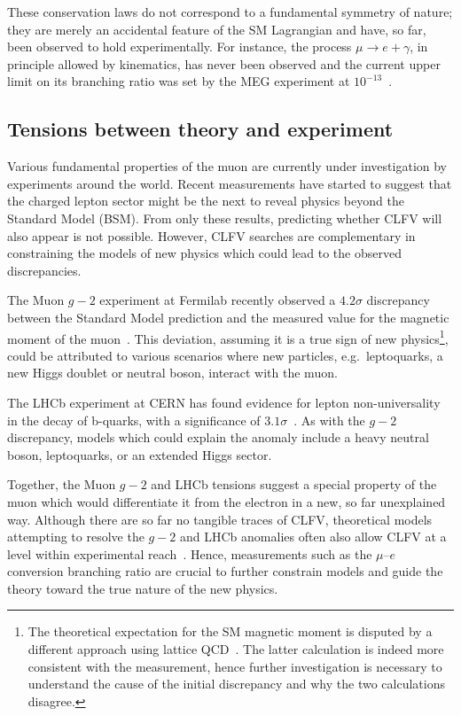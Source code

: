 These conservation laws do not correspond to a fundamental symmetry of nature;
they are merely an accidental feature of the SM Lagrangian and have, so far,
been observed to hold experimentally. 
For instance, the process ${\mu \rightarrow e + \gamma}$, in principle allowed
by kinematics, has never been observed and the current upper limit on its
branching ratio was set by the MEG experiment at
$10^{-13}$~\cite{mori2016final}. 



\subsection{Tensions between theory and experiment}
Various fundamental properties of the muon are currently under investigation by
experiments around the world. Recent measurements have started to suggest that
the charged lepton sector might be the next to reveal physics beyond the
Standard Model (BSM). From only these results, predicting whether CLFV will also
appear is not possible. However, CLFV searches are complementary in constraining
the models of new physics which could lead to the observed discrepancies.

The Muon $g-2$ experiment at Fermilab recently observed a $4.2\sigma$
discrepancy between the Standard Model prediction and the measured value for the
magnetic moment of the muon~\cite{PhysRevLett.126.141801}. This deviation,
assuming it is a true sign of new physics\footnote{
    The theoretical expectation for the SM magnetic moment is disputed by a
    different approach using lattice QCD~\cite{Borsanyi2021}. The latter calculation
    is indeed more consistent with the measurement, hence further investigation is
    necessary to understand the cause of the initial discrepancy and why the two
    calculations disagree.
}, could be attributed to various scenarios where new particles, e.g.\ 
leptoquarks, a new Higgs doublet or neutral boson, interact with the muon.


The LHCb experiment at CERN has found evidence for lepton non-universality in
the decay of b-quarks, with a significance of $3.1\sigma$~\cite{Aaij2022}. As
with the $g-2$ discrepancy, models which could explain the anomaly include a
heavy neutral boson, leptoquarks, or an extended Higgs sector. 

Together, the Muon $g-2$ and LHCb tensions suggest a special property of the
muon which would differentiate it from the electron in a new, so far unexplained
way. Although there are so far no tangible traces of CLFV, theoretical models
attempting to resolve the $g-2$ and LHCb anomalies often also allow CLFV at a
level within experimental reach~\cite{DEGOUVEA201375, PhysRevD.101.115016,
PhysRevD.100.115010}. Hence, measurements such as the $\mu$--$e$ conversion
branching ratio are crucial to further constrain models and guide the theory
toward the true nature of the new physics.


